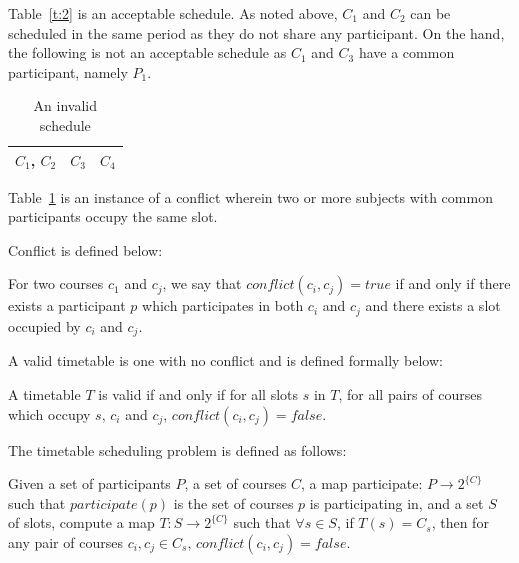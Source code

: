 \documentclass[11pt,a4paper]{article}
\begin{document}
\begin{myex}
\begin{table}
\end{table}

Table~\ref{t:2} is an acceptable schedule. As noted above, $C_1$ and $C_2$ can be scheduled in the same period as they do not share any participant. On the hand, the following is not an acceptable schedule as $C_1$ and $C_3$ have a common participant, namely $P_1$.

\begin{table}
\begin{center}

\begin{tabular}{| c | c | c |}
\hline
$C_1$, $C_2$ & $C_3$ & $C_4$ \\
\hline
\end{tabular}
\caption{An invalid schedule}
 \label{t:3}
 \end{center}

\end{table}

Table~\ref{t:3} is an instance of a conflict wherein two or more subjects with common participants occupy the same slot. 
\end{myex}

Conflict is defined below:

\begin{mydef}[Conflict]
For two courses $c_1$ and $c_j$, we say that $conflict(c_i, c_j) = true$ if and only if there exists a participant $p$ which participates in both $c_i$ and $c_j$ and there exists a slot occupied by $c_i$ and $c_j$.
\end{mydef}

A valid timetable is one with no conflict and is defined formally below:
\begin{mydef}
A timetable $T$ is valid if and only if for all slots $s$ in $T$, for all pairs of courses which occupy $s$, $c_i$ and $c_j$, $conflict(c_i, c_j) = false$.
\end{mydef}

The timetable scheduling problem is defined as follows:
\begin{mydef}
Given a set of participants $P$, a set of courses $C$, a map participate: $P \rightarrow 2^{\{C\}}$ such that $participate(p)$ is the set of courses $p$ is participating in, and a set $S$ of slots, compute a map $T: S\rightarrow2^{\{C\}}$ such that $\forall s \in S$, if $T(s) = C_s$, then for any pair of courses $c_i, c_j \in C_s$, $conflict(c_i, c_j) = false$.
\end{mydef}
\end{document}
